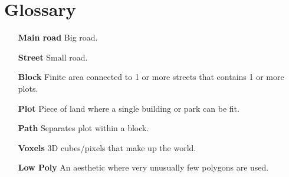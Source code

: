 \section*{Glossary}

\begin{itemize}
    \item[\textbf{Main road}]{Big road.}
    \item[\textbf{Street}]{Small road.}
    \item[\textbf{Block}]{Finite area connected to 1 or more streets that contains 1 or more plots.}
    \item[\textbf{Plot}]{Piece of land where a single building or park can be fit.}
    \item[\textbf{Path}]{Separates plot within a block.}
    \item[\textbf{Voxels}]{3D cubes/pixels that make up the world.}
    \item[\textbf{Low Poly}]{An aesthetic where very unusually few polygons are used.}
\end{itemize}